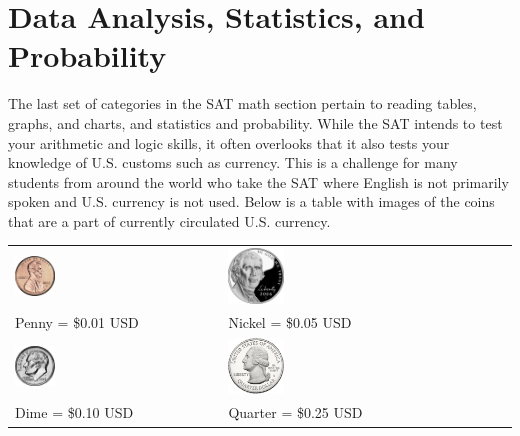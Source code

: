 \chapter{Data Analysis, Statistics, and Probability}

The last set of categories in the SAT math section pertain to reading tables, graphs, and charts, and statistics and probability. While the SAT intends to test your arithmetic and logic skills, it often overlooks that it also tests your knowledge of U.S. customs such as currency. This is a challenge for many students from around the world who take the SAT where English is not primarily spoken and U.S. currency is not used. Below is a table with images of the coins that are a part of currently circulated U.S. currency.

\vspace{2em}

\bigskip
\begin{center}
\begin{tabularx}{0.75\textwidth}{*2{@{}>{\centering\arraybackslash}X}}
\includegraphics[width=0.2\textwidth]{penny}&
\includegraphics[width=0.2\textwidth]{nickel}\\
Penny = \$0.01 USD & Nickel = \$0.05 USD\\[2em]
\includegraphics[width=0.2\textwidth]{dime}&
\includegraphics[width=0.2\textwidth]{quarter}\\
Dime = \$0.10 USD & Quarter = \$0.25 USD
\end{tabularx}
\end{center}
